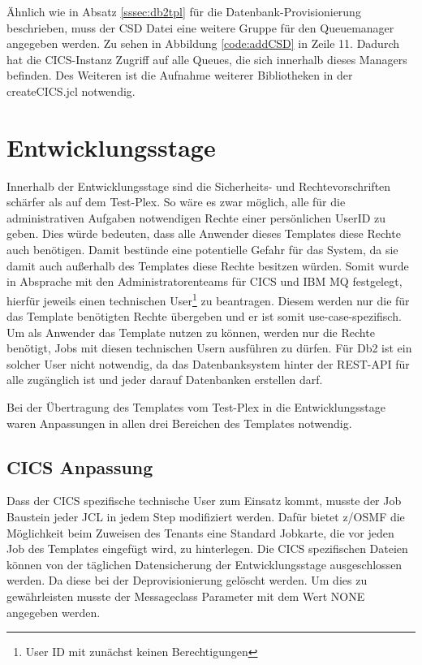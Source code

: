 Ähnlich wie in Absatz \ref{sssec:db2tpl} für die Datenbank-Provisionierung beschrieben, muss der CSD Datei eine weitere Gruppe für den Queuemanager angegeben werden.
Zu sehen in Abbildung \ref{code:addCSD} in Zeile 11.
Dadurch hat die CICS-Instanz Zugriff auf alle Queues, die sich innerhalb dieses Managers befinden.
Des Weiteren ist die Aufnahme weiterer Bibliotheken in der \glqq createCICS.jcl\grqq{} notwendig.

\section{Entwicklungsstage}
Innerhalb der Entwicklungsstage sind die Sicherheits- und Rechtevorschriften schärfer als auf dem Test-Plex.
So wäre es zwar möglich, alle für die administrativen Aufgaben notwendigen Rechte einer persönlichen UserID zu geben.
Dies würde bedeuten, dass alle Anwender dieses Templates diese Rechte auch benötigen.
Damit bestünde eine potentielle Gefahr für das System, da sie damit auch außerhalb des Templates diese Rechte besitzen würden.
Somit wurde in Absprache mit den Administratorenteams für CICS und IBM MQ festgelegt, hierfür jeweils einen technischen User\footnote{User ID mit zunächst keinen Berechtigungen} zu beantragen.
Diesem werden nur die für das Template benötigten Rechte übergeben und er ist somit use-case-spezifisch.
Um als Anwender das Template nutzen zu können, werden nur die Rechte benötigt, Jobs mit diesen technischen Usern ausführen zu dürfen.
Für Db2 ist ein solcher User nicht notwendig, da das Datenbanksystem hinter der REST-API für alle zugänglich ist und jeder darauf Datenbanken erstellen darf.

Bei der Übertragung des Templates vom Test-Plex in die Entwicklungsstage waren Anpassungen in allen drei Bereichen des Templates notwendig.

\subsection{CICS Anpassung}
Dass der CICS spezifische technische User zum Einsatz kommt, musste der \glqq Job\grqq{} Baustein jeder JCL in jedem Step modifiziert werden.
Dafür bietet z/OSMF die Möglichkeit beim Zuweisen des \glqq Tenants\grqq{} eine Standard Jobkarte, die vor jeden Job des Templates eingefügt wird, zu hinterlegen.
Die CICS spezifischen Dateien können von der täglichen Datensicherung der Entwicklungsstage ausgeschlossen werden.
Da diese bei der Deprovisionierung gelöscht werden.
Um dies zu gewährleisten musste der Messageclass Parameter mit dem Wert  \glqq NONE\grqq{} angegeben werden.

